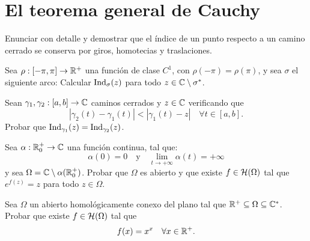 \section{El teorema general de Cauchy}

\begin{ejercicio}
    Enunciar con detalle y demostrar que el índice de un punto respecto a un camino cerrado se conserva por giros, homotecias y traslaciones.
\end{ejercicio}

\begin{ejercicio}
    Sea $\rho : [-\pi,\pi] \to \mathbb{R}^+$ una función de clase $C^1$, con $\rho(-\pi)=\rho(\pi)$, y sea $\sigma$ el siguiente arco:
    Calcular $\operatorname{Ind}_\sigma(z)$ para todo $z \in \mathbb{C}\setminus\sigma^*$.
\end{ejercicio}

\begin{ejercicio}
    Sean $\gamma_1, \gamma_2 : [a,b] \to \mathbb{C}$ caminos cerrados y $z \in \mathbb{C}$ verificando que
    \begin{equation*}
        | \gamma_2(t) - \gamma_1(t) | < | \gamma_1(t) - z | \quad \forall t \in [a,b].
    \end{equation*}
    Probar que $\operatorname{Ind}_{\gamma_1}(z) = \operatorname{Ind}_{\gamma_2}(z)$.
\end{ejercicio}

\begin{ejercicio}
    Sea $\alpha : \mathbb{R}^+_0 \to \mathbb{C}$ una función continua, tal que:
    \begin{equation*}
        \alpha(0) = 0 \quad \text{y} \quad \lim_{t \to +\infty} \alpha(t) = +\infty
    \end{equation*}
    y sea $\Omega = \mathbb{C} \setminus \alpha(\mathbb{R}^+_0)$. Probar que $\Omega$ es abierto y que existe $f \in \mathcal{H}(\Omega)$ tal que $e^{f(z)} = z$ para todo $z \in \Omega$.
\end{ejercicio}

\begin{ejercicio}
    Sea $\Omega$ un abierto homológicamente conexo del plano tal que $\mathbb{R}^+ \subseteq \Omega \subseteq \mathbb{C}^*$. Probar que existe $f \in \mathcal{H}(\Omega)$ tal que
    \begin{equation*}
        f(x) = x^x \quad \forall x \in \mathbb{R}^+.
    \end{equation*}
\end{ejercicio}
